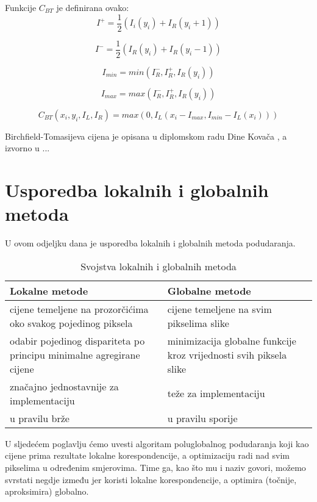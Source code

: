 \documentclass[utf8, zavrsni, numeric]{fer}
\begin{document}
Funkcije $C_{BT}$ je definirana ovako:
\begin{equation}
I^+ = \frac{1}{2}(I_i(y_i) + I_R(y_i + 1))
\end{equation}

\begin{equation}
I^- = \frac{1}{2}(I_R(y_i) + I_R(y_i - 1))
\end{equation}

\begin{equation}
I_{min} = min(I^-_R, I^+_R, I_R(y_i))
\end{equation}

\begin{equation}
I_{max} = max(I^-_R, I^+_R, I_R(y_i))
\end{equation}

\begin{equation}
C_{BT}(x_i, y_i, I_L, I_R) = max(0, I_L(x_i - I_{max}, I_{min} - I_L(x_i)))
\end{equation}

Birchfield-Tomasijeva cijena je opisana u diplomskom radu Dine Kovača \cite{kovac15ms}, a izvorno u ...

\section{Usporedba lokalnih i globalnih metoda}
U ovom odjeljku dana je usporedba lokalnih i globalnih metoda podudaranja.

\begin{table}[htbp]
  \caption{Svojstva lokalnih i globalnih metoda}
  \label{tbl:usp_lok_glob}
  \centering
  \begin{tabularx}{\textwidth}{X|X} \hline
    {\bf Lokalne metode} & {\bf Globalne metode} \\
    \hline
    cijene temeljene na prozorčićima oko svakog pojedinog piksela & cijene temeljene na svim pikselima slike \\
    \hline
    odabir pojedinog dispariteta po principu minimalne agregirane cijene & minimizacija globalne funkcije kroz vrijednosti svih piksela slike \\
    \hline
    značajno jednostavnije za implementaciju & teže za implementaciju \\
    \hline
    u pravilu brže & u pravilu sporije \\
  \end{tabularx}
\end{table}

U sljedećem poglavlju ćemo uvesti algoritam poluglobalnog podudaranja koji kao cijene prima rezultate lokalne korespondencije, a optimizaciju radi nad svim
pikselima u određenim smjerovima. Time ga, kao što mu i naziv govori, možemo svrstati negdje između jer koristi lokalne korespondencije, a optimira (točnije, aproksimira) globalno.
\end{document}
